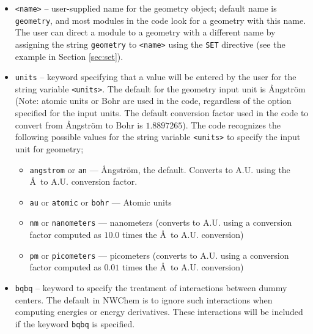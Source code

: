 \begin{itemize}
\item \verb+<name>+ -- user-supplied name for the geometry object; default
name is \verb+geometry+, and
most modules in the code look for a geometry with this name.  The user
can direct a module to a geometry with a different name by assigning
the string \verb+geometry+ to \verb+<name>+ using the \verb+SET+
directive (see the example in Section \ref{sec:set}).

\item \verb+units+ -- keyword specifying that a value will be entered
by the user for the string variable \verb+<units>+.  
The default for the geometry input unit is {\AA}ngstr\"{o}m
(Note: atomic units or Bohr are used in the code, regardless of
the option specified for the input units.  
The default
conversion factor used in the code to convert from {\AA}ngstr\"{o}m to
Bohr is $1.8897265$).
The code recognizes the following possible values for the string variable
\verb+<units>+  to specify the input unit for geometry;
\begin{itemize}
  \item \verb+angstrom+ or \verb+an+ --- {\AA}ngstr\"{o}m, the default.  Converts
   to A.U. using the \AA\ to A.U. conversion factor.
  \item \verb+au+ or \verb+atomic+ or \verb+bohr+ --- Atomic units
  \item \verb+nm+ or \verb+nanometers+ --- nanometers (converts to
     A.U. using a conversion factor computed as $10.0$ times the
     \AA\ to A.U. conversion) 
  \item \verb+pm+ or \verb+picometers+ --- picometers (converts to 
    A.U. using a conversion factor computed as $0.01$ times the 
     \AA\ to A.U. conversion)
\end{itemize}
      
\item \verb+bqbq+ -- keyword to specify the treatment of interactions 
between dummy centers.  The default in NWChem is to ignore such interactions
when computing energies or energy derivatives.  These interactions
will be included if the keyword \verb+bqbq+ is specified.


\end{itemize}
